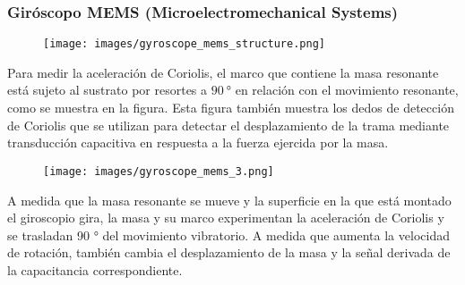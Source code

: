 \begin{frame}
    \frametitle{Giróscopo MEMS (Microelectromechanical Systems)}
    \footnotesize

    \begin{figure}[!h]
        \centering
        \texttt{[image: images/gyroscope\_mems\_structure.png]}
    \end{figure}


    Para medir la aceleración de Coriolis, el marco que contiene la masa resonante está sujeto al sustrato por resortes a $\SI{90}{\degree}$ en relación con el movimiento resonante, como se muestra en la figura. Esta figura también muestra los dedos de detección de Coriolis que se utilizan para detectar el desplazamiento de la trama mediante transducción capacitiva en respuesta a la fuerza ejercida por la masa.

    \begin{figure}[!h]
        \centering
        \texttt{[image: images/gyroscope\_mems\_3.png]}
    \end{figure}

    A medida que la masa resonante se mueve y la superficie en la que está montado el giroscopio gira, la masa y su marco experimentan la aceleración de Coriolis y se trasladan 90 ° del movimiento vibratorio. A medida que aumenta la velocidad de rotación, también cambia el desplazamiento de la masa y la señal derivada de la capacitancia correspondiente.
\end{frame}



